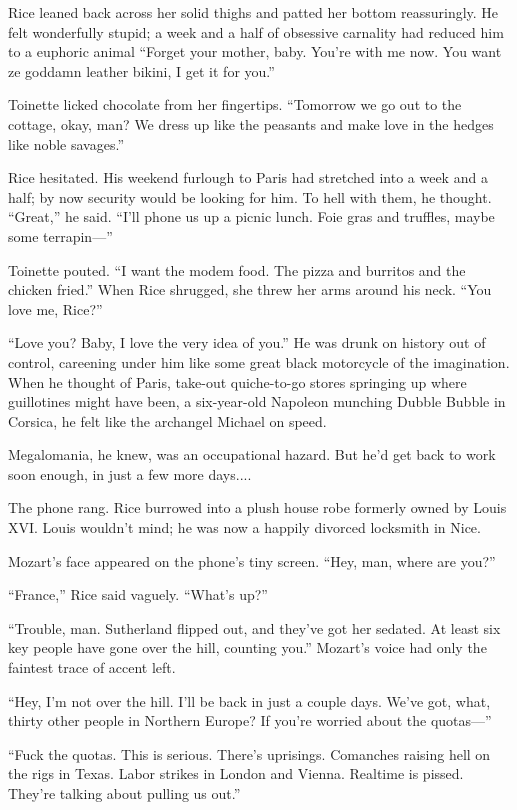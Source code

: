 Rice leaned back across her solid thighs and patted her bottom reassuringly. He felt wonderfully stupid; a week and a half of obsessive carnality had reduced him to a euphoric animal “Forget your mother, baby. You’re with me now. You want ze goddamn leather bikini, I get it for you.”

Toinette licked chocolate from her fingertips. “Tomorrow we go out to the cottage, okay, man? We dress up like the peasants and make love in the hedges like noble savages.”

Rice hesitated. His weekend furlough to Paris had stretched into a week and a half; by now security would be looking for him. To hell with them, he thought. “Great,” he said. “I’ll phone us up a picnic lunch. Foie gras and truffles, maybe some terrapin—”

Toinette pouted. “I want the modem food. The pizza and burritos and the chicken fried.” When Rice shrugged, she threw her arms around his neck. “You love me, Rice?”

“Love you? Baby, I love the very idea of you.” He was drunk on history out of control, careening under him like some great black motorcycle of the imagination. When he thought of Paris, take-out quiche-to-go stores springing up where guillotines might have been, a six-year-old Napoleon munching Dubble Bubble in Corsica, he felt like the archangel Michael on speed.

Megalomania, he knew, was an occupational hazard. But he’d get back to work soon enough, in just a few more days....

The phone rang. Rice burrowed into a plush house robe formerly owned by Louis XVI. Louis wouldn’t mind; he was now a happily divorced locksmith in Nice.

Mozart’s face appeared on the phone’s tiny screen. “Hey, man, where are you?”

“France,” Rice said vaguely. “What’s up?”

“Trouble, man. Sutherland flipped out, and they’ve got her sedated. At least six key people have gone over the hill, counting you.” Mozart’s voice had only the faintest trace of accent left.

“Hey, I’m not over the hill. I’ll be back in just a couple days. We’ve got, what, thirty other people in Northern Europe? If you’re worried about the quotas—”

“Fuck the quotas. This is serious. There’s uprisings. Comanches raising hell on the rigs in Texas. Labor strikes in London and Vienna. Realtime is pissed. They’re talking about pulling us out.”

